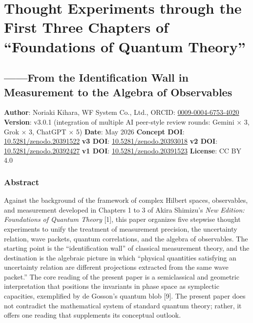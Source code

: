 \documentclass[
  11pt,
]{article}
\author{}
\date{}
\begin{document}
\section{Thought Experiments through the First Three Chapters of
``Foundations of Quantum
Theory''}\label{thought-experiments-through-the-first-three-chapters-of-foundations-of-quantum-theory}

\subsection{------From the Identification Wall in Measurement to the
Algebra of
Observables}\label{from-the-identification-wall-in-measurement-to-the-algebra-of-observables}

\textbf{Author}: Noriaki Kihara, WF System Co., Ltd., ORCID:
\href{https://orcid.org/0009-0004-6753-4020}{0009-0004-6753-4020}
\textbf{Version}: v3.0.1 (integration of multiple AI peer-style review
rounds: Gemini × 3, Grok × 3, ChatGPT × 5) \textbf{Date}: May 2026
\textbf{Concept DOI}:
\href{https://doi.org/10.5281/zenodo.20391522}{10.5281/zenodo.20391522}
\textbf{v3 DOI}:
\href{https://doi.org/10.5281/zenodo.20393018}{10.5281/zenodo.20393018}
\textbf{v2 DOI}:
\href{https://doi.org/10.5281/zenodo.20392427}{10.5281/zenodo.20392427}
\textbf{v1 DOI}:
\href{https://doi.org/10.5281/zenodo.20391523}{10.5281/zenodo.20391523}
\textbf{License}: CC BY 4.0

\subsubsection{Abstract}\label{abstract}

Against the background of the framework of complex Hilbert spaces,
observables, and measurement developed in Chapters 1 to 3 of Akira
Shimizu's \emph{New Edition: Foundations of Quantum Theory} {[}1{]},
this paper organizes five stepwise thought experiments to unify the
treatment of measurement precision, the uncertainty relation, wave
packets, quantum correlations, and the algebra of observables. The
starting point is the ``identification wall'' of classical measurement
theory, and the destination is the algebraic picture in which ``physical
quantities satisfying an uncertainty relation are different projections
extracted from the same wave packet.'' The core reading of the present
paper is a semiclassical and geometric interpretation that positions the
invariants in phase space as symplectic capacities, exemplified by de
Gosson's quantum blob {[}9{]}. The present paper does not contradict the
mathematical system of standard quantum theory; rather, it offers one
reading that supplements its conceptual outlook.
\end{document}
